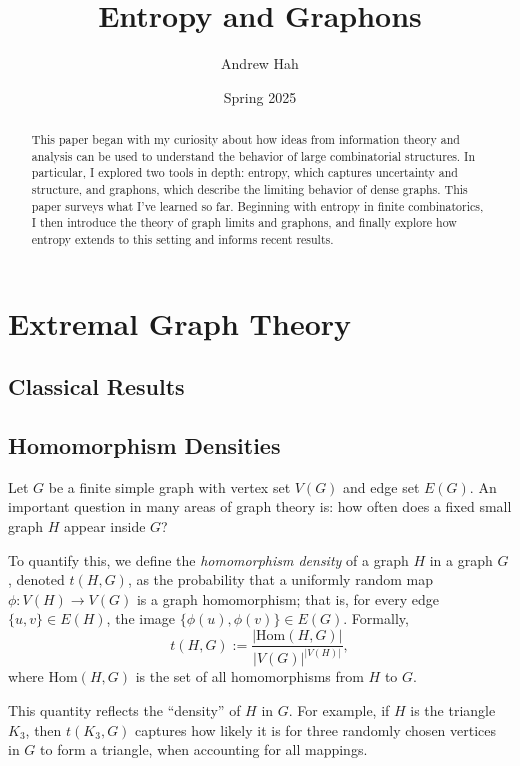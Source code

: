\documentclass[11pt]{article}
\title{Entropy and Graphons}
\author{Andrew Hah}
\date{\vspace{-.75em}Spring 2025}
\begin{document}
\maketitle

\begin{abstract}
This paper began with my curiosity about how ideas from information theory and analysis can be used to understand the behavior of large combinatorial structures. In particular, I explored two tools in depth: entropy, which captures uncertainty and structure, and graphons, which describe the limiting behavior of dense graphs. This paper surveys what I’ve learned so far. Beginning with entropy in finite combinatorics, I then introduce the theory of graph limits and graphons, and finally explore how entropy extends to this setting and informs recent results.
\end{abstract}

\tableofcontents

\section{Extremal Graph Theory}

\subsection{Classical Results}

\subsection{Homomorphism Densities}
Let \( G \) be a finite simple graph with vertex set \( V(G) \) and edge set \( E(G) \). An important question in many areas of graph theory is: how often does a fixed small graph \( H \) appear inside \( G \)?

To quantify this, we define the \emph{homomorphism density} of a graph \( H \) in a graph \( G \), denoted \( t(H, G) \), as the probability that a uniformly random map \( \phi : V(H) \to V(G) \) is a graph homomorphism; that is, for every edge \( \{u, v\} \in E(H) \), the image \( \{\phi(u), \phi(v)\} \in E(G) \). Formally,
\[
t(H, G) := \frac{|\mathrm{Hom}(H, G)|}{|V(G)|^{|V(H)|}},
\]
where \( \mathrm{Hom}(H, G) \) is the set of all homomorphisms from \( H \) to \( G \).

This quantity reflects the “density” of \( H \) in \( G \). For example, if \( H \) is the triangle \( K_3 \), then \( t(K_3, G) \) captures how likely it is for three randomly chosen vertices in \( G \) to form a triangle, when accounting for all mappings.
\end{document}
